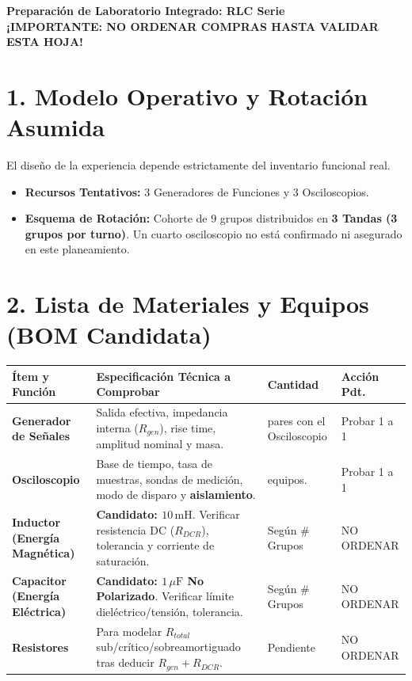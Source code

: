 \documentclass[11pt, a4paper]{article}
\begin{document}
\begin{tcolorbox}[colback=warnred!5!white, colframe=warnred, title=\textbf{BOM PROVISIONAL Y GATE DE AUTORIZACIÓN (USO DOCENTE)}]
    \centering \textbf{Preparación de Laboratorio Integrado: RLC Serie} \\
    \textbf{¡IMPORTANTE: NO ORDENAR COMPRAS HASTA VALIDAR ESTA HOJA!}
\end{tcolorbox}

\section*{1. Modelo Operativo y Rotación Asumida}
El diseño de la experiencia depende estrictamente del inventario funcional real.
\begin{itemize}
    \item \textbf{Recursos Tentativos:} 3 Generadores de Funciones y 3 Osciloscopios.
    \item \textbf{Esquema de Rotación:} Cohorte de 9 grupos distribuidos en \textbf{3 Tandas (3 grupos por turno)}. Un cuarto osciloscopio no está confirmado ni asegurado en este planeamiento.
\end{itemize}

\section*{2. Lista de Materiales y Equipos (BOM Candidata)}

\renewcommand{\arraystretch}{1.5}
\noindent
\begin{tabularx}{\textwidth}{>{\bfseries\RaggedRight}p{3cm} >{\RaggedRight\arraybackslash}X >{\centering\arraybackslash}p{2.5cm} >{\centering\arraybackslash}p{2.5cm}}
\toprule
\textbf{Ítem y Función} & \textbf{Especificación Técnica a Comprobar} & \textbf{Cantidad} & \textbf{Acción Pdt.} \\ 
\midrule
Generador de Señales & Salida efectiva, impedancia interna ($R_{gen}$), rise time, amplitud nominal y masa. & 3 pares con el Osciloscopio & Probar 1 a 1 \\ \addlinespace
Osciloscopio & Base de tiempo, tasa de muestras, sondas de medición, modo de disparo y \textbf{aislamiento}. & 3 equipos. & Probar 1 a 1 \\ \addlinespace
Inductor (Energía Magnética) & \textbf{Candidato: $10\,\text{mH}$}. Verificar resistencia DC ($R_{DCR}$), tolerancia y corriente de saturación. & Según \# Grupos & NO ORDENAR \\ \addlinespace
Capacitor (Energía Eléctrica) & \textbf{Candidato: $1\,\mu\text{F}$ No Polarizado}. Verificar límite dieléctrico/tensión, tolerancia. & Según \# Grupos & NO ORDENAR \\ \addlinespace
Resistores & Para modelar $R_{total}$ sub/crítico/sobreamortiguado tras deducir $R_{gen} + R_{DCR}$. & Pendiente & NO ORDENAR \\ 
\bottomrule
\end{tabularx}
\end{document}
